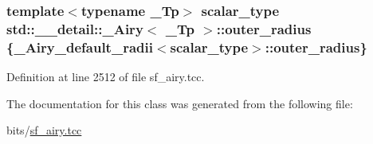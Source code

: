 \subsubsection[{\texorpdfstring{outer\+\_\+radius}{outer_radius}}]{\setlength{\rightskip}{0pt plus 5cm}template$<$typename \+\_\+\+Tp$>$ {\bf scalar\+\_\+type} {\bf std\+::\+\_\+\+\_\+detail\+::\+\_\+\+Airy}$<$ \+\_\+\+Tp $>$\+::outer\+\_\+radius \{{\bf \+\_\+\+Airy\+\_\+default\+\_\+radii}$<${\bf scalar\+\_\+type}$>$\+::outer\+\_\+radius\}}\hypertarget{classstd_1_1____detail_1_1__Airy_af688e5d14ed305f95f0e9d9d58d3bf9a}{}\label{classstd_1_1____detail_1_1__Airy_af688e5d14ed305f95f0e9d9d58d3bf9a}


Definition at line 2512 of file sf\+\_\+airy.\+tcc.



The documentation for this class was generated from the following file\+:\begin{DoxyCompactItemize}
\item 
bits/\hyperlink{sf__airy_8tcc}{sf\+\_\+airy.\+tcc}\end{DoxyCompactItemize}
